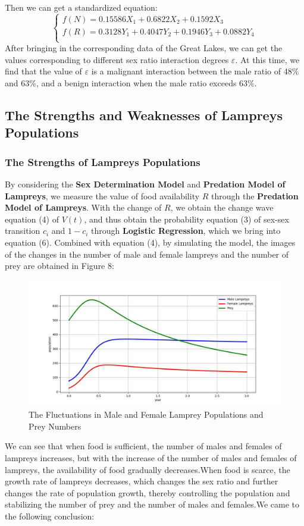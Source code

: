 \documentclass[12pt]{article}  %
\begin{document}
Then we can get a standardized equation:
	\begin{equation}
		\begin{cases}
			f\left( N \right) =0.15586X_1+0.6822X_2+0.1592X_3\\
			f\left( R \right) =0.3128Y_1+0.4047Y_2+0.1946Y_3+0.0882Y_{4}\\
		\end{cases}
	\end{equation}
After bringing in the corresponding data of the Great Lakes, we can get the values corresponding to different sex ratio interaction degrees  $\varepsilon$. At this time, we find that the value of $\varepsilon$ is a malignant interaction between the male ratio of 48$\% $ and 63$\%$, and a benign interaction when the male ratio exceeds 63$\%$.
\subsection{The Strengths and Weaknesses of Lampreys Populations}
\subsubsection{The Strengths of Lampreys Populations}
By considering the \textbf{Sex Determination Model} and\textbf{ Predation Model of Lampreys}, we measure the value of food availability $ R $ through the \textbf{ Predation Model of Lampreys}. With the change of $R$, we obtain the change wave equation (4) of $V (t)$, and thus obtain the probability equation (3) of sex-sex transition $c_{i}$ and $1-c_{i}$ through\textbf{ Logistic Regression}, which we bring into equation (6). Combined with equation (4), by simulating the model, the images of the changes in the number of male and female lampreys and the number of prey are obtained in Figure 8:
\vspace{-0.4cm}
\begin{figure}[H] %
	\centering  %
	\includegraphics[width=.6\textwidth]{test(1)(1).jpg} %
	\caption{The Fluctuations in Male and Female Lamprey Populations and Prey Numbers}
\end{figure}
\vspace{-0.8cm}
We can see that when food is sufficient, the number of males and females of lampreys increases, but with the increase of the number of males and females of lampreys, the availability of food gradually decreases.When food is scarce, the growth rate of lampreys decreases, which changes the sex ratio and further changes the rate of population growth, thereby controlling the population and stabilizing the number of prey and the number of males and females.We came to the following conclusion:
\end{document}

